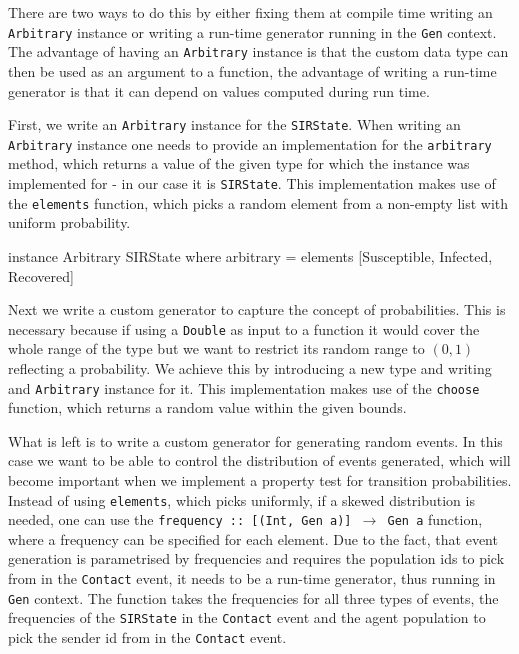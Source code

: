 There are two ways to do this by either fixing them at compile time writing an \texttt{Arbitrary} instance or writing a run-time generator running in the \texttt{Gen} context. The advantage of having an \texttt{Arbitrary} instance is that the custom data type can then be used as an argument to a function, the advantage of writing a run-time generator is that it can depend on values computed during run time.

First, we write an \texttt{Arbitrary} instance for the \texttt{SIRState}. When writing an \texttt{Arbitrary} instance one needs to provide an implementation for the \texttt{arbitrary} method, which returns a value of the given type for which the instance was implemented for - in our case it is \texttt{SIRState}. This implementation makes use of the \texttt{elements} function, which picks a random element from a non-empty list with uniform probability.

\begin{HaskellCode}
instance Arbitrary SIRState where
  arbitrary = elements [Susceptible, Infected, Recovered]
\end{HaskellCode}

Next we write a custom generator to capture the concept of probabilities. This is necessary because if using a \texttt{Double} as input to a function it would cover the whole range of the type but we want to restrict its random range to $(0,1)$ reflecting a probability. We achieve this by introducing a new type and writing and \texttt{Arbitrary} instance for it. This implementation makes use of the \texttt{choose} function, which returns a random value within the given bounds.


What is left is to write a custom generator for generating random events. In this case we want to be able to control the distribution of events generated, which will become important when we implement a property test for transition probabilities. Instead of using \texttt{elements}, which picks uniformly, if a skewed distribution is needed, one can use the \texttt{frequency :: [(Int, Gen a)] $\rightarrow$ Gen a} function, where a frequency can be specified for each element. Due to the fact, that event generation is parametrised by frequencies and requires the population ids to pick from in the \texttt{Contact} event, it needs to be a run-time generator, thus running in \texttt{Gen} context. The function takes the frequencies for all three types of events, the frequencies of the \texttt{SIRState} in the \texttt{Contact} event and the agent population to pick the sender id from in the \texttt{Contact} event.

